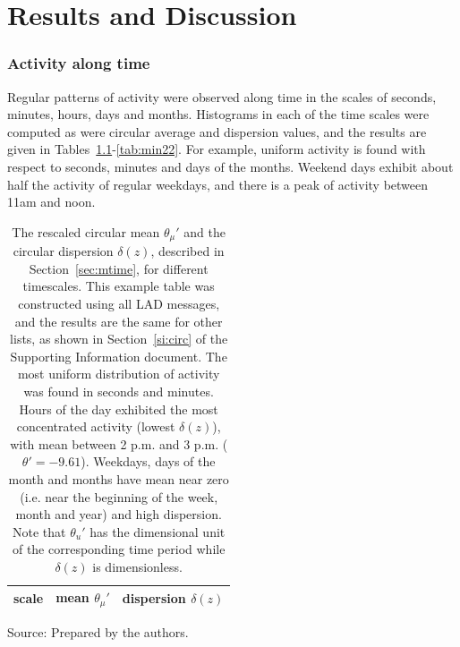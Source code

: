 \chapter{Results and Discussion}
\label{ch:disc}
\subsection{Activity along time}\label{constDisc}
Regular patterns of activity were observed along time
in the scales of seconds, minutes, hours, days and months.
Histograms in each of the time scales were computed as were circular average and dispersion values, and the results are given in Tables~\ref{tab:circ}-\ref{tab:min22}. For example, uniform activity is found with respect to seconds, minutes and days of the months. Weekend days exhibit about half the activity of regular weekdays, and there is a peak of activity between 11am and noon.


\begin{table}
\caption{The rescaled circular mean $\theta_\mu'$ and the circular dispersion $\delta(z)$, described in Section~\ref{sec:mtime}, for different timescales. This example table was constructed using all LAD messages, and the results are the same for other lists, as shown in Section~\ref*{si:circ} of the Supporting Information document. The most uniform distribution of activity was found in seconds and minutes. 	Hours of the day exhibited the most concentrated activity (lowest $\delta(z)$), with mean between 2 p.m. and 3 p.m. ($\theta'=-9.61$). Weekdays, days of the month and months have mean near zero (i.e. near the beginning of the week, month and year) and high dispersion. Note that $\theta_u'$ has the dimensional unit of the corresponding time period while $\delta(z)$ is dimensionless.}
\begin{center}
\begin{tabular}{ |l|| c|c| }
\hline
scale & mean $\theta_\mu'$ & dispersion $\delta(z)$  \\ \hline

\end{tabular}
\begin{flushleft}
		Source: Prepared by the authors.\
\end{flushleft}
\end{center}
\label{tab:circ}
\end{table}

